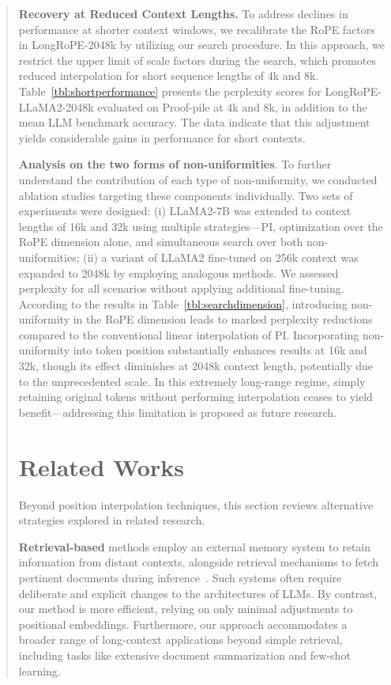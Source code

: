 \begin{abstract}
\textbf{Recovery at Reduced Context Lengths.} To address declines in performance at shorter context windows, we recalibrate the RoPE factors in LongRoPE-2048k by utilizing our search procedure. In this approach, we restrict the upper limit of scale factors during the search, which promotes reduced interpolation for short sequence lengths of 4k and 8k. Table~\ref{tbl:shortperformance} presents the perplexity scores for LongRoPE-LLaMA2-2048k evaluated on Proof-pile at 4k and 8k, in addition to the mean LLM benchmark accuracy. The data indicate that this adjustment yields considerable gains in performance for short contexts.

\textbf{Analysis on the two forms of non-uniformities}. To further understand the contribution of each type of non-uniformity, we conducted ablation studies targeting these components individually. Two sets of experiments were designed: (i) LLaMA2-7B was extended to context lengths of 16k and 32k using multiple strategies—PI, optimization over the RoPE dimension alone, and simultaneous search over both non-uniformities; (ii) a variant of LLaMA2 fine-tuned on 256k context was expanded to 2048k by employing analogous methods. We assessed perplexity for all scenarios without applying additional fine-tuning. According to the results in Table~\ref{tbl:searchdimension}, introducing non-uniformity in the RoPE dimension leads to marked perplexity reductions compared to the conventional linear interpolation of PI. Incorporating non-uniformity into token position substantially enhances results at 16k and 32k, though its effect diminishes at 2048k context length, potentially due to the unprecedented scale. In this extremely long-range regime, simply retaining original tokens without performing interpolation ceases to yield benefit—addressing this limitation is proposed as future research.

\section{Related Works}

Beyond position interpolation techniques, this section reviews alternative strategies explored in related research.

\textbf{Retrieval-based} methods employ an external memory system to retain information from distant contexts, alongside retrieval mechanisms to fetch pertinent documents during inference~\cite{longllama,wang2023augmenting,borgeaud2022improving}. Such systems often require deliberate and explicit changes to the architectures of LLMs. By contrast, our method is more efficient, relying on only minimal adjustments to positional embeddings. Furthermore, our approach accommodates a broader range of long-context applications beyond simple retrieval, including tasks like extensive document summarization and few-shot learning.


\end{abstract}
